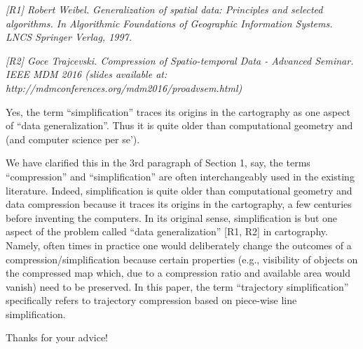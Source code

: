 \documentclass{letter}
\begin{document}
\emph{[R1] Robert Weibel. Generalization of spatial data: Principles and selected algorithms. In Algorithmic Foundations of Geographic Information Systems. LNCS Springer Verlag, 1997.}


\emph{[R2] Goce Trajcevski. Compression of Spatio-temporal Data - Advanced Seminar. IEEE MDM 2016 (slides available at: http://mdmconferences.org/mdm2016/proadvsem.html)}


Yes, the term ``simplification'' traces its origins in the cartography as one aspect of ``data generalization''. Thus it is quite older than computational geometry and (and computer science per se'). 

We have clarified this in the 3rd paragraph of Section 1, say, the terms ``compression'' and  ``simplification'' are often interchangeably used in the existing literature. Indeed, simplification is quite older than computational geometry and data compression because it traces its origins in the cartography, a few centuries before inventing the computers. In its original sense, simplification is but one aspect of the problem called ``data generalization'' [R1, R2]  in cartography. Namely, often times in practice one would deliberately change the outcomes of a compression/simplification because certain properties (e.g., visibility of objects on the compressed map which, due to a compression ratio and available area would vanish) need to be preserved. In this paper, the term ``trajectory simplification'' specifically  refers to trajectory compression based on piece-wise line simplification.

 
Thanks for your advice!

\end{document}
